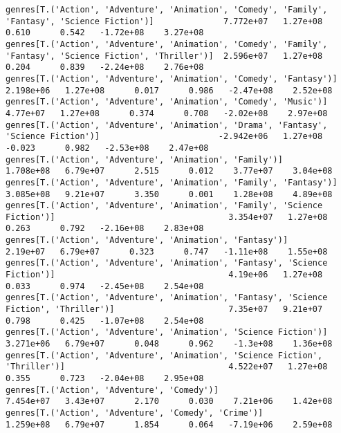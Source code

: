 \documentclass[11pt]{article}
\begin{document}
\begin{Verbatim}[commandchars=\\\{\}]
genres[T.('Action', 'Adventure', 'Animation', 'Comedy', 'Family', 'Fantasy', 'Science Fiction')]              7.772e+07   1.27e+08      0.610      0.542   -1.72e+08    3.27e+08
genres[T.('Action', 'Adventure', 'Animation', 'Comedy', 'Family', 'Fantasy', 'Science Fiction', 'Thriller')]  2.596e+07   1.27e+08      0.204      0.839   -2.24e+08    2.76e+08
genres[T.('Action', 'Adventure', 'Animation', 'Comedy', 'Fantasy')]                                           2.198e+06   1.27e+08      0.017      0.986   -2.47e+08    2.52e+08
genres[T.('Action', 'Adventure', 'Animation', 'Comedy', 'Music')]                                              4.77e+07   1.27e+08      0.374      0.708   -2.02e+08    2.97e+08
genres[T.('Action', 'Adventure', 'Animation', 'Drama', 'Fantasy', 'Science Fiction')]                        -2.942e+06   1.27e+08     -0.023      0.982   -2.53e+08    2.47e+08
genres[T.('Action', 'Adventure', 'Animation', 'Family')]                                                      1.708e+08   6.79e+07      2.515      0.012    3.77e+07    3.04e+08
genres[T.('Action', 'Adventure', 'Animation', 'Family', 'Fantasy')]                                           3.085e+08   9.21e+07      3.350      0.001    1.28e+08    4.89e+08
genres[T.('Action', 'Adventure', 'Animation', 'Family', 'Science Fiction')]                                   3.354e+07   1.27e+08      0.263      0.792   -2.16e+08    2.83e+08
genres[T.('Action', 'Adventure', 'Animation', 'Fantasy')]                                                      2.19e+07   6.79e+07      0.323      0.747   -1.11e+08    1.55e+08
genres[T.('Action', 'Adventure', 'Animation', 'Fantasy', 'Science Fiction')]                                   4.19e+06   1.27e+08      0.033      0.974   -2.45e+08    2.54e+08
genres[T.('Action', 'Adventure', 'Animation', 'Fantasy', 'Science Fiction', 'Thriller')]                       7.35e+07   9.21e+07      0.798      0.425   -1.07e+08    2.54e+08
genres[T.('Action', 'Adventure', 'Animation', 'Science Fiction')]                                             3.271e+06   6.79e+07      0.048      0.962    -1.3e+08    1.36e+08
genres[T.('Action', 'Adventure', 'Animation', 'Science Fiction', 'Thriller')]                                 4.522e+07   1.27e+08      0.355      0.723   -2.04e+08    2.95e+08
genres[T.('Action', 'Adventure', 'Comedy')]                                                                   7.454e+07   3.43e+07      2.170      0.030    7.21e+06    1.42e+08
genres[T.('Action', 'Adventure', 'Comedy', 'Crime')]                                                          1.259e+08   6.79e+07      1.854      0.064   -7.19e+06    2.59e+08

\end{Verbatim}
\end{document}
